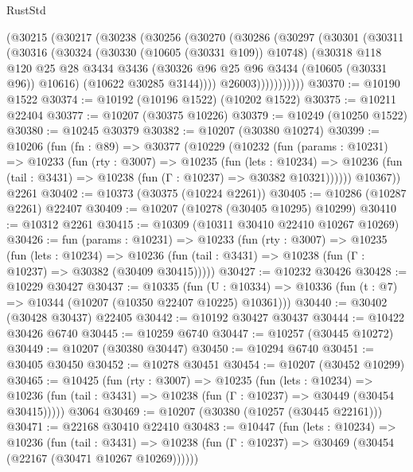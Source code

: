 \begin{lexlean}{RustStd}
\begin{coremodule}
        (@30215
          (@30217
            (@30238
              (@30256
                (@30270
                  (@30286
                    (@30297
                      (@30301
                        (@30311
                          (@30316
                            (@30324
                              (@30330 (@10605 (@30331 @109)) @10748)
                              (@30318
                                @118
                                @120
                                @25
                                @28
                                @3434
                                @3436
                                (@30326 @96 @25 @96 @3434 (@10605 (@30331 @96)) @10616)
                                (@10622 @30285 @3144))))
                          @26003)))))))))))
@30370 := @10190 @1522
@30374 := @10192 (@10196 @1522) (@10202 @1522)
@30375 := @10211 @22404
@30377 := @10207 (@30375 @10226)
@30379 := @10249 (@10250 @1522)
@30380 := @10245 @30379
@30382 := @10207 (@30380 @10274)
@30399 := @10206
    (fun (fn : @89) =>
    @30377
      (@10229
        (@10232
          (fun (params : @10231) =>
          @10233
            (fun (rty : @3007) =>
            @10235
              (fun (lets : @10234) =>
              @10236 (fun (tail : @3431) => @10238 (fun (Γ : @10237) => @30382 @10321))))))
        @10367))
    @2261
@30402 := @10373 (@30375 (@10224 @2261))
@30405 := @10286 (@10287 @2261) @22407
@30409 := @10207 (@10278 (@30405 @10295) @10299)
@30410 := @10312 @2261
@30415 := @10309 (@10311 @30410 @22410 @10267 @10269)
@30426 := fun (params : @10231) =>
  @10233
    (fun (rty : @3007) =>
    @10235
      (fun (lets : @10234) =>
      @10236 (fun (tail : @3431) => @10238 (fun (Γ : @10237) => @30382 (@30409 @30415)))))
@30427 := @10232 @30426
@30428 := @10229 @30427
@30437 := @10335
    (fun (U : @10334) => @10336 (fun (t : @7) => @10344 (@10207 (@10350 @22407 @10225) @10361)))
@30440 := @30402 (@30428 @30437) @22405
@30442 := @10192 @30427 @30437
@30444 := @10422 @30426 @6740
@30445 := @10259 @6740
@30447 := @10257 (@30445 @10272)
@30449 := @10207 (@30380 @30447)
@30450 := @10294 @6740
@30451 := @30405 @30450
@30452 := @10278 @30451
@30454 := @10207 (@30452 @10299)
@30465 := @10425
    (fun (rty : @3007) =>
    @10235
      (fun (lets : @10234) =>
      @10236 (fun (tail : @3431) => @10238 (fun (Γ : @10237) => @30449 (@30454 @30415)))))
    @3064
@30469 := @10207 (@30380 (@10257 (@30445 @22161)))
@30471 := @22168 @30410 @22410
@30483 := @10447
    (fun (lets : @10234) =>
    @10236
      (fun (tail : @3431) =>
      @10238 (fun (Γ : @10237) => @30469 (@30454 (@22167 (@30471 @10267 @10269))))))

\end{coremodule}
\end{lexlean}
